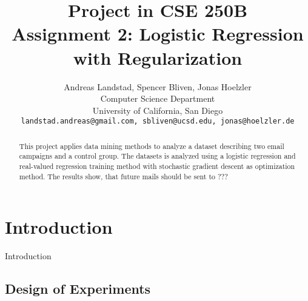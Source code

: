 \documentclass[10pt,twocolumn,letterpaper]{article}
\begin{document}
\title{
Project in CSE 250B\\
Assignment 2: Logistic Regression with Regularization}

\author{Andreas Landstad, Spencer Bliven, Jonas Hoelzler\\
Computer Science Department\\
University of California, San Diego\\
{\tt\small landstad.andreas@gmail.com, sbliven@ucsd.edu, jonas@hoelzler.de}
}%
\maketitle
\thispagestyle{empty}

\begin{abstract}
This project applies data mining methods to analyze a dataset describing two email campaigns and a control group. The datasets is analyzed using a logistic regression and real-valued regression training method with stochastic gradient descent as optimization method.
The results show, that future mails should be sent to ???
\end{abstract}

\section{Introduction}
Introduction
\subsection{Design of Experiments}
\end{document}
